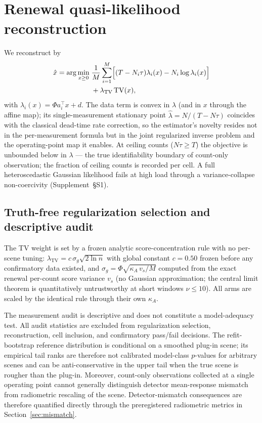 \documentclass[10pt,twocolumn]{article}
\begin{document}
\section{Renewal quasi-likelihood reconstruction}
\label{sec:rql}
We reconstruct by
\begin{equation}
  \begin{aligned}
  \hat{x}=\arg\min_{x\ge0}\;&\frac{1}{M}\sum_{i=1}^{M}
  \Bigl[(T-N_i\tau)\lambda_i(x)-N_i\log\lambda_i(x)\Bigr]\\
  &+\lambda_{\mathrm{TV}}\,\mathrm{TV}(x),
  \end{aligned}
  \label{eq:rql}
\end{equation}
with $\lambda_i(x) = \Phi a_i^{\top} x + d$. The data term is convex in
$\lambda$ (and in $x$ through the affine map); its single-measurement
stationary point $\hat\lambda = N/(T - N\tau)$ coincides with the classical
dead-time rate correction, so the estimator's novelty resides not in the
per-measurement formula but in the joint regularized inverse problem and the
operating-point map it enables. At ceiling counts ($N\tau \ge T$) the
objective is unbounded below in $\lambda$ — the true identifiability boundary
of count-only observation; the fraction of ceiling counts is recorded per
cell. A full heteroscedastic Gaussian likelihood fails at high load through a
variance-collapse non-coercivity (Supplement~\S S1).

\subsection{Truth-free regularization selection and descriptive audit}
\label{sec:selection}
The TV weight is set by a frozen analytic score-concentration rule with no
per-scene tuning: $\lambda_{\mathrm{TV}} = c\,\sigma_{g}\sqrt{2\ln n}$ with
global constant $c = 0.50$ frozen before any confirmatory data existed, and
$\sigma_{g} = \Phi\sqrt{\kappa_A\, v_s / M}$ computed from the exact renewal
per-count score variance $v_s$ (no Gaussian approximation; the central limit
theorem is quantitatively untrustworthy at short windows $\nu \le 10$). All
arms are scaled by the identical rule through their own $\kappa_A$.

The measurement audit is descriptive and does not constitute a model-adequacy
test. All audit statistics are excluded from regularization selection,
reconstruction, cell inclusion, and confirmatory pass/fail decisions. The
refit-bootstrap reference distribution is conditional on a smoothed plug-in
scene; its empirical tail ranks are therefore not calibrated model-class
$p$-values for arbitrary scenes and can be anti-conservative in the upper
tail when the true scene is rougher than the plug-in. Moreover, count-only
observations collected at a single operating point cannot generally
distinguish detector mean-response mismatch from radiometric rescaling of the
scene. Detector-mismatch consequences are therefore quantified directly
through the preregistered radiometric metrics in
Section~\ref{sec:mismatch}.
\end{document}
